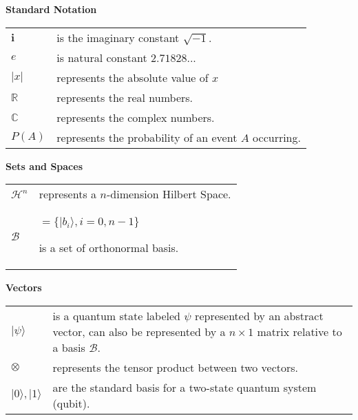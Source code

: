 


\listofsymbols






\textbf{Standard Notation}

\renewcommand*{\arraystretch}{1.4}
\begin{longtable}[l]{p{50pt} p{300pt}} 

$\mathbf{i}$
&
 is the imaginary constant $\sqrt{-1}$.
\\
$e$ 
&
is natural constant $2.71828...$
\\
$\vert x \vert $
&
 represents the absolute value of $x$
\\
$\mathbb{R}$ 
&
represents the real numbers.
\\
$\mathbb{C}$ 
&
represents the complex numbers.
\\
$P(A)$ 
& 
represents the probability of an event $A$ occurring.
\\
\end{longtable}
\textbf{Sets and Spaces}

\renewcommand*{\arraystretch}{1.4}
\begin{longtable}[l]{p{50pt} p{300pt}}

$\mathcal{H}^{n}$ 
&
represents a $n$-dimension Hilbert Space.
\\
$\mathcal{B}$ & $= \{ \vert b_{i} \rangle, i=0, n-1\}$

 is a set of orthonormal basis.
\\
\end{longtable}

\textbf{Vectors}

\renewcommand*{\arraystretch}{1.4}
\begin{longtable}[l]{p{50pt} p{300pt}}

$\vert \psi \rangle$
&
 is a quantum state labeled $\psi$ represented by an abstract vector, can also be represented by a $n \times 1$ matrix relative to a basis $\mathcal{B}$.
\\
$\otimes$
&
 represents the tensor product between two vectors.
\\
$ \vert 0 \rangle , \vert 1 \rangle$
&
 are the standard basis for a two-state quantum system (qubit).
\\
\end{longtable}


